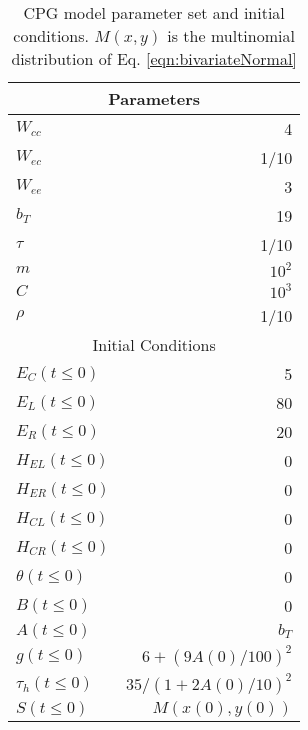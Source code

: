 \begin{table}[ht!]
 \centering
\begin{tabular}{| l | r |}
 \hline 
\multicolumn{2}{|c|}{Parameters} \\
 \hline 
$W_{cc}$ & 4 \\ \hline
$W_{ec}$ & 1/10\\ \hline
$W_{ee}$ & 3\\ \hline
$b_T$ & 19 \\ \hline
$\tau$ & 1/10 \\ \hline
$m$ & $10^2$ \\ \hline
$C$ & $10^3$ \\ \hline
$\rho$ & 1/10 \\ %
 \hline 
\multicolumn{2}{|c|}{Initial Conditions} \\
 \hline 
$E_C(t \leq 0)$ & 5 \\
$E_L(t \leq 0)$ & 80 \\
$E_R(t \leq 0)$ & 20 \\
$H_{EL}(t \leq 0)$ & 0 \\
$H_{ER}(t \leq 0)$ & 0 \\
$H_{CL}(t \leq 0)$ & 0 \\
$H_{CR}(t \leq 0)$ & 0 \\
$\theta(t \leq 0) $ & 0 \\
$B(t \leq 0) $ & 0 \\
$A(t \leq 0) $ & $b_T$ \\
$g(t \leq 0) $ & $6 + (9 A(0)/100)^2$ \\
$\tau_h(t \leq 0) $ & $35 / (1 + 2A(0)/10)^2$ \\ 
$S(t \leq 0) $ & $M(x(0),y(0))$ \\ \hline
\end{tabular}
 \caption{CPG model parameter set and initial conditions. $M(x,y)$ is the multinomial distribution of Eq. \eqref{eqn:bivariateNormal}
\label{tbl:OscparameterSet} }
\end{table}

\clearpage
